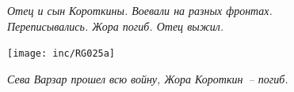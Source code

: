 \vfill

\begin{figure}[h!]
    \begin{minipage}{75mm}
        \begin{minipage}[h!]{34mm}
        \end{minipage}
        \hspace{3mm}
        \begin{minipage}[h!]{36mm}
        \end{minipage}
      
      
        \vspace{-10pt}
        \textit{\footnotesize{Отец и сын Короткины. Воевали на разных фронтах. Переписывались. Жора погиб. Отец выжил.}}  
      
    \end{minipage}
    \hspace{3mm}
    \begin{minipage}[h!]{37mm}
        \texttt{[image: inc/RG025a]}
        
        \vspace{-10pt}
        \textit{\footnotesize{Сева Варзар прошел всю войну, Жора Короткин~-- погиб.}}
    \end{minipage}
      
      
\end{figure}

\newpage %


